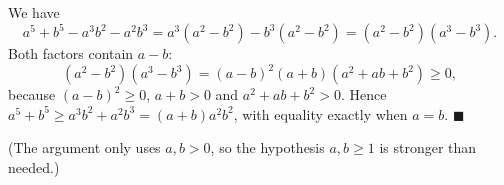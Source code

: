 We have
\[a^5+b^5-a^3b^2-a^2b^3=a^3\left(a^2-b^2\right)-b^3\left(a^2-b^2\right)=\left(a^2-b^2\right)\left(a^3-b^3\right).\]
Both factors contain $a-b$:
\[\left(a^2-b^2\right)\left(a^3-b^3\right)=(a-b)^2(a+b)\left(a^2+ab+b^2\right)\ge0,\]
because $(a-b)^2\ge0$, $a+b>0$ and $a^2+ab+b^2>0$. Hence $a^5+b^5\ge a^3b^2+a^2b^3=(a+b)a^2b^2$, with equality exactly when $a=b$. $\blacksquare$

(The argument only uses $a,b>0$, so the hypothesis $a,b\ge1$ is stronger than needed.)
